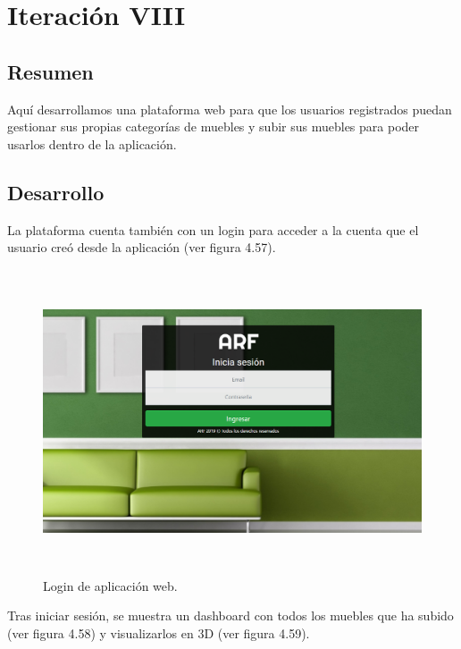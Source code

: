 \section{Iteración VIII}
\subsection{Resumen}
Aquí desarrollamos una plataforma web para que los usuarios registrados puedan gestionar sus propias categorías de muebles y subir sus muebles para poder usarlos dentro de la aplicación.

\subsection{Desarrollo}
La plataforma cuenta también con un login para acceder a la cuenta que el usuario creó desde la aplicación (ver figura 4.57).

\begin{figure}[hbt!]
	\centering
	\includegraphics[width=15cm,height=9cm]{imagenes/desarrollo/app/WEB_LOGIN.png}
	\caption{Login de aplicación web.}
	\label{fig:weblogin}
\end{figure}

Tras iniciar sesión, se muestra un dashboard con todos los muebles que ha subido (ver figura 4.58) y visualizarlos en 3D (ver figura 4.59).

